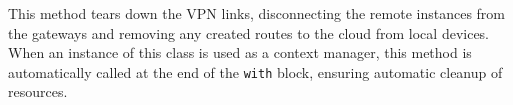 \begin{description}[]
    \item[\texttt{VPNCloudMesh.tear_down(self)}]
    This method tears down the \ac{VPN} links, disconnecting the remote instances from the gateways and removing any created routes to the cloud from local devices.
    When an instance of this class is used as a context manager, this method is automatically called at the end of the \texttt{with} block, ensuring automatic cleanup of resources.
    
\end{description}
